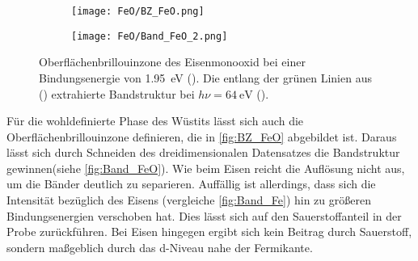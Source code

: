         \begin{figure}
            \begin{subfigure}[t]{0.34\textwidth}
                \centering
                \texttt{[image: FeO/BZ\_FeO.png]}
                \subcaption{}
                \label{fig:BZ_FeO}
            \end{subfigure}
            \begin{subfigure}[t]{0.62\textwidth}
                \centering
                \texttt{[image: FeO/Band\_FeO\_2.png]}
                \subcaption{}
                \label{fig:Band_FeO}
            \end{subfigure}
            \caption{Oberflächenbrillouinzone des Eisenmonooxid bei einer Bindungsenergie von \SI{1.95}{\electronvolt} ().
            Die entlang der grünen Linien aus () extrahierte Bandstruktur bei $h\nu = \SI{64}{\electronvolt}$ ().}
        \end{figure}
        Für die wohldefinierte Phase des Wüstits lässt sich auch die Oberflächenbrillouinzone definieren, die in \autoref{fig:BZ_FeO} abgebildet ist.
        Daraus lässt sich durch Schneiden des dreidimensionalen Datensatzes die Bandstruktur gewinnen(siehe \autoref{fig:Band_FeO}).
        Wie beim Eisen reicht die Auflösung nicht aus, um die Bänder deutlich zu separieren.
        Auffällig ist allerdings, dass sich die Intensität bezüglich des Eisens (vergleiche \autoref{fig:Band_Fe}) hin zu größeren Bindungsenergien verschoben hat.
        Dies lässt sich auf den Sauerstoffanteil in der Probe zurückführen. 
        Bei Eisen hingegen ergibt sich kein Beitrag durch Sauerstoff, sondern maßgeblich durch das d-Niveau nahe der Fermikante.
    
